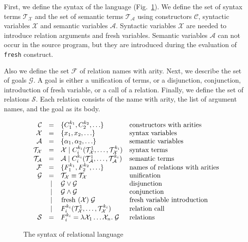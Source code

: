 First, we define the syntax of the language (Fig.~\ref{fair:syntax}). We define the set of syntax terms $\mathcal{T}_\mathcal{X}$ and the set of semantic terms
$\mathcal{T}_\mathcal{A}$ using constructors $\mathcal{C}$, syntactic variables $\mathcal{X}$ and semantic variables $\mathcal{A}$. Syntactic variables $\mathcal{X}$
are needed to introduce relation arguments and fresh variables. Semantic variables $\mathcal{A}$ can not occur in the source program, but they are introduced during
the evaluation of \lstinline{fresh} construct.

Also we define the set $\mathcal{F}$ of relation names with arity. Next, we describe the set of goals $\mathcal{G}$. A goal is either a unification of terms, or a disjunction, conjunction, introduction
of fresh variable, or a call of a relation. Finally, we define the set of relations $\mathcal{S}$. Each relation consists of the name with arity, the list of argument names,
and the goal as its body.

\begin{figure}[h]
\[
  \begin{array}{rcll}
     \mathcal{C} & = & \{ C_1^{k_1}, C_2^{k_2}, \ldots \} 
     & \mbox{constructors with arities} 
     \\
     \mathcal{X} & = & \{x_1, x_2, \ldots \} 
     & \mbox{syntax variables} 
     \\
     \mathcal{A} & = & \{\alpha_1, \alpha_2, \ldots \} 
     & \mbox{semantic variables} 
     \\
     \mathcal{T}_\mathcal{X} & = & \mathcal{X} \mid C_i^{k_i}(\mathcal{T}_\mathcal{X}^1, \ldots, \mathcal{T}_\mathcal{X}^{k_i})
     & \mbox{syntax terms} 
     \\
     \mathcal{T}_\mathcal{A} & = & \mathcal{A} \mid C_i^{k_i}(\mathcal{T}_\mathcal{A}^1, \ldots, \mathcal{T}_\mathcal{A}^{k_i})
     & \mbox{semantic terms} 
     \\
     \mathcal{F} & = & \{F_1^{k_1}, F_2^{k_2}, \ldots \} 
     & \mbox{names of relations with arities} 
     \\
     \mathcal{G} & =    & \mathcal{T}_\mathcal{X} \equiv \mathcal{T}_\mathcal{X} & \mbox{unification} \\
                 & \mid & \mathcal{G} \lor \mathcal{G} & \mbox{disjunction} \\
                 & \mid & \mathcal{G} \land \mathcal{G} & \mbox{conjunction} \\
                 & \mid & \mbox{\lstinline|fresh|} \; (\mathcal{X}) \; \mathcal{G} & \mbox{fresh variable introduction} \\
                 & \mid &  F_i^{k_i}(\mathcal{T}_\mathcal{X}^1, \ldots, \mathcal{T}_\mathcal{X}^{k_i}) & \mbox{relation call} \\
    \mathcal{S} & = &F_i^{k_i} = \lambda \mathcal{X}_1 \ldots \mathcal{X}_n. \; \mathcal{G} & \mbox{relations}
  \end{array}
\]
    \caption{The syntax of relational language}
    \label{fair:syntax}
\end{figure}

